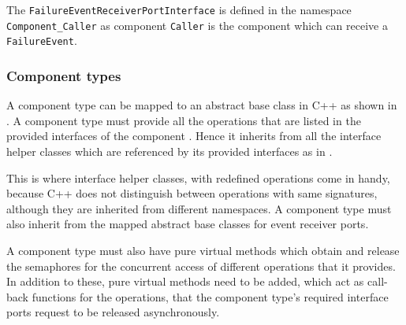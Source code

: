 The \texttt{FailureEvent\allowbreak Receiver\allowbreak Port\allowbreak Interface} is defined in the namespace \texttt{Component\allowbreak\_Caller} as component \texttt{Caller} is the component which can receive a \texttt{FailureEvent}.

\subsubsection{\textbf{Component types}}
A component type can be mapped to an abstract base class in C++ as shown in \cite{EvoRAVCodeAr}. A component type must provide all the operations that are listed in the provided interfaces of the component \cite{CompBasedProcess}. Hence it inherits from all the interface helper classes which are referenced by its provided interfaces as in \cite{EvoRAVCodeAr}. 

This is where interface helper classes, with redefined operations come in handy, because C++ does not distinguish between operations with same signatures, although they are inherited from different namespaces. A component type must also inherit from the mapped abstract base classes for event receiver ports.

A component type must also have pure virtual methods which obtain and release the semaphores for the concurrent access of different operations that it provides. In addition to these, pure virtual methods need to be added, which act as call-back functions for the operations, that the component type's required interface ports request to be released asynchronously.   


